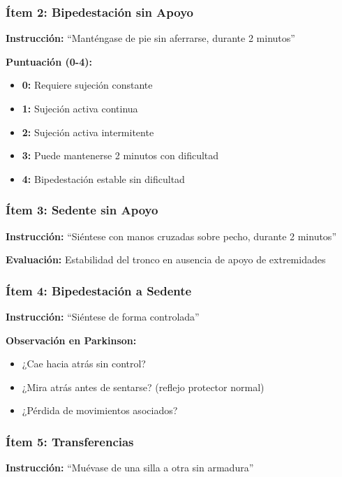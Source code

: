 \documentclass[12pt,a4paper,spanish,oneside]{book}
\begin{document}
\subsubsection{Ítem 2: Bipedestación sin Apoyo}

\textbf{Instrucción:} ``Manténgase de pie sin aferrarse, durante 2 minutos''

\textbf{Puntuación (0-4):}
\begin{itemize}
  \item \textbf{0:} Requiere sujeción constante
  \item \textbf{1:} Sujeción activa continua
  \item \textbf{2:} Sujeción activa intermitente
  \item \textbf{3:} Puede mantenerse 2 minutos con dificultad
  \item \textbf{4:} Bipedestación estable sin dificultad
\end{itemize}

\subsubsection{Ítem 3: Sedente sin Apoyo}

\textbf{Instrucción:} ``Siéntese con manos cruzadas sobre pecho, durante 2 minutos''

\textbf{Evaluación:} Estabilidad del tronco en ausencia de apoyo de extremidades

\subsubsection{Ítem 4: Bipedestación a Sedente}

\textbf{Instrucción:} ``Siéntese de forma controlada''

\textbf{Observación en Parkinson:}
\begin{itemize}
  \item ¿Cae hacia atrás sin control?
  \item ¿Mira atrás antes de sentarse? (reflejo protector normal)
  \item ¿Pérdida de movimientos asociados?
\end{itemize}

\subsubsection{Ítem 5: Transferencias}

\textbf{Instrucción:} ``Muévase de una silla a otra sin armadura''
\end{document}
